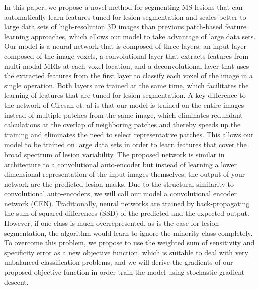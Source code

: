 % 
% 
%   

In this paper, we propose a novel method for segmenting MS lesions that can
automatically learn features tuned for lesion segmentation and scales better to
large data sets of high-resolution 3D images than previous patch-based feature
learning approaches, which allows our model to take advantage of large data
sets. Our model is a neural network that is composed of three layers: an input
layer composed of the image voxels, a convolutional layer \cite{LeCun1998} that
extracts features from multi-modal MRIs at each voxel location, and a
deconvolutional layer \cite{zeiler2011} that uses the extracted features from
the first layer to classify each voxel of the image in a single operation. Both
layers are trained at the same time, which facilitates the learning of features
that are tuned for lesion segmentation. A key difference to the network of
Ciresan et. al \cite{Ciresan2012} is that our model is trained on the entire
images instead of multiple patches from the same image, which eliminates
redundant calculations at the overlap of neighboring patches and thereby speeds
up the training and eliminates the need to select representative patches. This
allows our model to be trained on large data sets in order to learn features
that cover the broad spectrum of lesion variability. The proposed network is
similar in architecture to a convolutional auto-encoder \cite{masci2011} but
instead of learning a lower dimensional representation of the input images
themselves, the output of your network are the predicted lesion masks. Due to
the structural similarity to convolutional auto-encoders, we will call our model
a convolutional encoder network (CEN). Traditionally, neural networks are
trained by back-propagating the sum of squared differences (SSD) of the
predicted and the expected output. However, if one class is much
overrepresented, as is the case for lesion segmentation, the algorithm would
learn to ignore the minority class completely. To overcome this problem, we
propose to use the weighted sum of sensitivity and specificity error as a new
objective function, which is suitable to deal with very unbalanced
classification problems, and we will derive the gradients of our proposed
objective function in order train the model using stochastic gradient descent.

